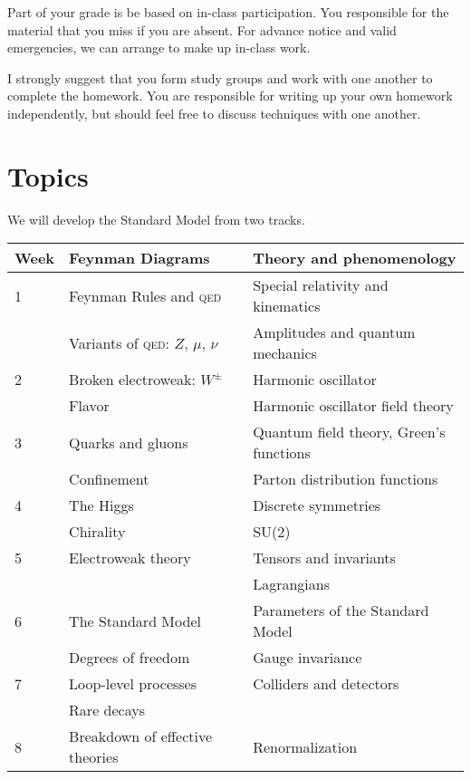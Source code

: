 \documentclass[12pt]{article}
\newcommand{\acro}[1]{\textsc{\MakeLowercase{#1}}}
\numberwithin{equation}{section}    %
\begin{document}
Part of your grade is be based on in-class participation. You responsible for the material that you miss if you are absent. For advance notice and valid emergencies, we can arrange to make up in-class work. 

I strongly suggest that you form study groups and work with one another to complete the homework. You are responsible for writing up your own homework independently, but should feel free to discuss techniques with one another. 


\section*{Topics}

We will develop the Standard Model from two tracks.
\vspace{1em} 

\noindent
\begin{tabular}{llll}
	{Week}
	&
	\textbf{Feynman Diagrams} 
	& \hspace{1cm} &
	\textbf{Theory and phenomenology}
	\\
	\hline
	1
	&
	Feynman Rules and \acro{QED}
	&&
	Special relativity and kinematics
	\\
	&
	Variants of \acro{QED}: $Z$, $\mu$, $\nu$
	&&
	Amplitudes and quantum mechanics
	\\
	\hline
	2
	&
	Broken electroweak: $W^\pm$
	&&
	Harmonic oscillator
	\\
	&
	Flavor
	&&
	Harmonic oscillator field theory
	\\
	\hline
	3
	&
	Quarks and gluons
	&&
	Quantum field theory, Green's functions
	\\
	&
	Confinement
	&&
	Parton distribution functions
	\\
	\hline
	4
	&
	The Higgs
	&&
	Discrete symmetries
	\\
	&
	Chirality
	&&
	SU(2)
	\\
	\hline
	5
	&
	Electroweak theory
	&&
	Tensors and invariants
	\\
	&
	
	&&
	Lagrangians
	\\
	\hline
	6
	&
	The Standard Model
	&&
	Parameters of the Standard Model
	\\
	&
	Degrees of freedom
	&&
	Gauge invariance
	\\
	\hline
	7
	&
	Loop-level processes
	&&
	Colliders and detectors
	\\
	&
	Rare decays
	&&
	\\
	\hline
	8
	&
	Breakdown of effective theories
	&&
	Renormalization
\end{tabular}
\vspace{1em}
\noindent 
\end{document}
